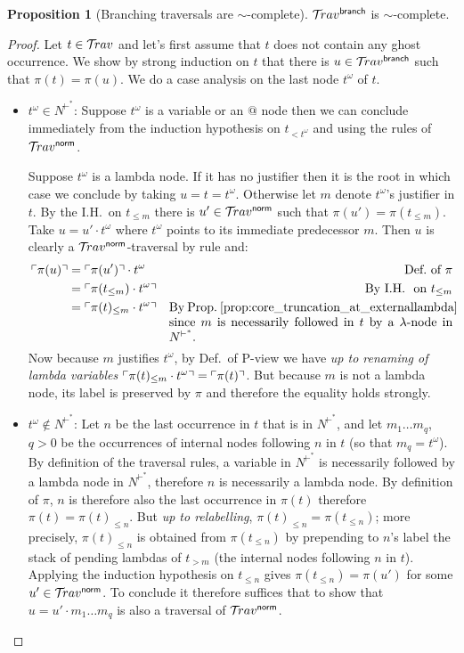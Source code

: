 \documentclass{article}
\theoremstyle{definition}
\newtheorem{proposition}{Proposition}[section]
\newcommand\Nodes{N}%
\newcommand{\normalizing}{{\sf norm}}
\newcommand{\branching}{{\sf branch}}
\newcommand{\travsetbr}{{\travset^\branching}}
\newcommand{\travsetnorm}{\travset^\normalizing}
\newcommand{\travulc}{\travset}
\def\coresymbol{\pi} %
\newcommand{\core}[1]{\coresymbol(#1)} %
\newcommand{\enables}{\vdash} %
\newcommand{\NodeHjByRoot}{\Nodes^{\enables^*}} %
\begin{document}
\begin{proposition}[Branching traversals are $\sim$-complete]
\label{prop:branching_traversal_normalizing}
  $\travsetbr$ is  $\sim$-complete.
\end{proposition}
\begin{proof}
Let $t\in\travulc$ and let's first assume that $t$ does not contain any ghost occurrence. We show by strong induction on $t$ that there is $u\in\travsetbr$ such that $\core{t} = \core{u}$.
We do a case analysis on the last node $t^\omega$ of $t$.
\begin{itemize}
\item $t^\omega\in \NodeHjByRoot$: Suppose $t^\omega$ is a variable or an $@$ node then we can conclude immediately from the induction hypothesis on $t_{<t^\omega}$ and using the rules  of $\travsetnorm$.

Suppose $t^\omega$ is a lambda node. If it has no justifier then it is the root in which case we conclude by taking  $u=t=t^\omega$. Otherwise let $m$ denote $t^\omega$'s justifier in $t$. By the I.H.~on $t_{\leq m}$ there is $u' \in \travsetnorm$ such that $\core{u'} = \core{t_{\leq m}}$. Take $u = u' \cdot t^\omega$ where $t^\omega$ points to its immediate predecessor $m$. Then $u$ is clearly a $\travsetnorm$-traversal by rule  and:
\begin{align*}
\pview{\core{u}} &= \pview{\core{u'}} \cdot t^\omega & \mbox{Def.~of $\coresymbol$}\\
 &= \pview{\core{t_{\leq m}} \cdot t^\omega} & \mbox{By I.H.~ on $t_{\leq m}$}\\
 &= \pview{\core{t}_{\leq m} \cdot t^\omega} & \parbox[t]{8cm}{By Prop.~\ref{prop:core_truncation_at_externallambda} since $m$ is necessarily followed in $t$ by a $\lambda$-node in $\NodeHjByRoot$.}
\end{align*}
Now because $m$ justifies $t^\omega$, by Def.~of P-view we have \emph{up to renaming of lambda variables} $\pview{\core{t}_{\leq m} \cdot t^\omega} = \pview{\core{t}}$. But because $m$ is not a lambda node, its label is preserved by $\coresymbol$ and therefore the equality holds strongly.

\item $t^\omega\not\in \NodeHjByRoot$: Let $n$ be the last occurrence in $t$ that is in $\NodeHjByRoot$, and let $m_1 \ldots m_q$, $q>0$ be the occurrences of internal nodes following $n$ in $t$ (so that $m_q = t^\omega$). By definition of the traversal rules, a variable in $\NodeHjByRoot$ is necessarily followed by a lambda node in $\NodeHjByRoot$, therefore $n$ is necessarily a lambda node. By definition of $\coresymbol$, $n$ is therefore also the last occurrence in $\core{t}$ therefore $\core{t} = \core{t}_{\leq n}$.
But \emph{up to relabelling}, $\core{t}_{\leq n} = \core{t_{\leq n}}$; more precisely, $\core{t}_{\leq n}$ is obtained from $\core{t_{\leq n}}$
by prepending to $n$'s label the stack of pending lambdas of $t_{>m}$ (the internal nodes following $n$ in $t$). Applying the induction hypothesis on $t_{\leq n}$ gives $\core{t_{\leq n}} = \core{u'}$ for some $u' \in \travsetnorm$.
To conclude it therefore suffices that to show that $u = u' \cdot m_1 \ldots m_q$ is also a traversal of $\travsetnorm$.


\end{itemize}
\end{proof}
\end{document}
